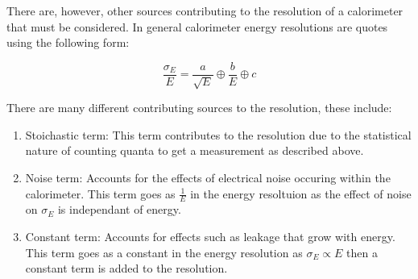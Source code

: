 There are, however, other sources contributing to the resolution of a calorimeter that must be considered.  In general calorimeter energy resolutions are quotes using the following form:

\begin{equation}
\frac{\sigma_{E}}{E} = \frac{a}{\sqrt{E}} \oplus \frac{b}{E} \oplus c
\end{equation}

There are many different contributing sources to the resolution, these include:
\begin{enumerate}
\item Stoichastic term:  This term contributes to the resolution due to the statistical nature of counting quanta to get a measurement as described above.
\item Noise term:  Accounts for the effects of electrical noise occuring within the calorimeter.  This term goes as $\frac{1}{E}$ in the energy resoltuion as the effect of noise on $\sigma_{E}$ is independant of energy.
\item Constant term:  Accounts for effects such as leakage that grow with energy.  This term goes as a constant in the energy resolution as $\sigma_{E} \propto E$ then a constant term is added to the resolution.
\end{enumerate}

